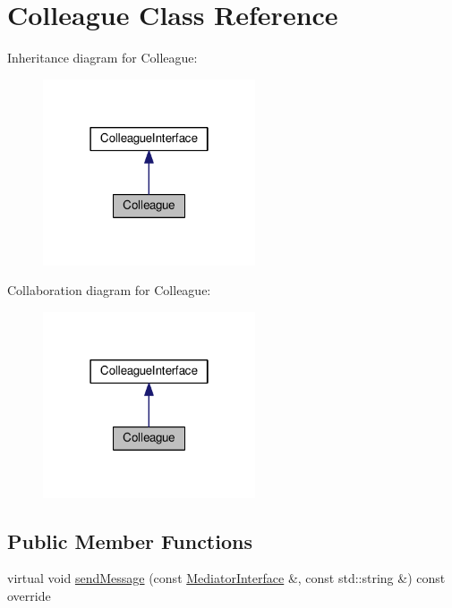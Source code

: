 \hypertarget{classColleague}{}\section{Colleague Class Reference}
\label{classColleague}


Inheritance diagram for Colleague\+:
\nopagebreak
\begin{figure}[H]
\begin{center}
\leavevmode
\includegraphics[width=178pt]{classColleague__inherit__graph}
\end{center}
\end{figure}


Collaboration diagram for Colleague\+:
\nopagebreak
\begin{figure}[H]
\begin{center}
\leavevmode
\includegraphics[width=178pt]{classColleague__coll__graph}
\end{center}
\end{figure}
\subsection*{Public Member Functions}
\begin{DoxyCompactItemize}
\item 
virtual void \hyperlink{classColleague_afb6563e15f8ea7f8931d5c51ad15cef6}{send\+Message} (const \hyperlink{classMediatorInterface}{Mediator\+Interface} \&, const std\+::string \&) const override
\end{DoxyCompactItemize}
